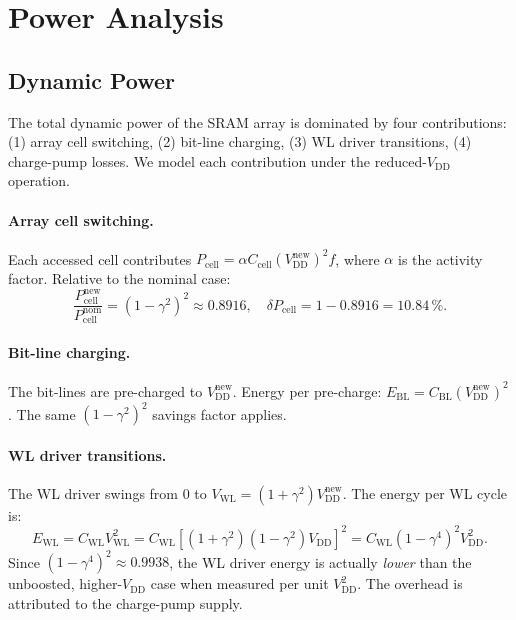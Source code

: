 \section{Power Analysis}
\label{sec:wlboost-power}

\subsection{Dynamic Power}

The total dynamic power of the SRAM array is dominated by four
contributions: (1) array cell switching, (2) bit-line charging, (3)
WL driver transitions, (4) charge-pump losses.  We model each
contribution under the reduced-$V_{\mathrm{DD}}$ operation.

\paragraph{Array cell switching.}
Each accessed cell contributes $P_{\mathrm{cell}} = \alpha C_{\mathrm{cell}}
(V_{\mathrm{DD}}^{\mathrm{new}})^{2} f$, where $\alpha$ is the
activity factor.  Relative to the nominal case:
\[
  \frac{P_{\mathrm{cell}}^{\mathrm{new}}}{P_{\mathrm{cell}}^{\mathrm{nom}}}
  = (1-\gamma^{2})^{2} \approx 0.8916, \quad
  \delta P_{\mathrm{cell}} = 1 - 0.8916 = 10.84\,\%.
\]

\paragraph{Bit-line charging.}
The bit-lines are pre-charged to $V_{\mathrm{DD}}^{\mathrm{new}}$.
Energy per pre-charge: $E_{\mathrm{BL}} = C_{\mathrm{BL}}
(V_{\mathrm{DD}}^{\mathrm{new}})^{2}$.  The same $(1-\gamma^{2})^{2}$
savings factor applies.

\paragraph{WL driver transitions.}
The WL driver swings from 0 to $V_{\mathrm{WL}} = (1+\gamma^{2})V_{\mathrm{DD}}^{\mathrm{new}}$.
The energy per WL cycle is:
\[
  E_{\mathrm{WL}} = C_{\mathrm{WL}} V_{\mathrm{WL}}^{2}
  = C_{\mathrm{WL}} [(1+\gamma^{2})(1-\gamma^{2})V_{\mathrm{DD}}]^{2}
  = C_{\mathrm{WL}} (1-\gamma^{4})^{2} V_{\mathrm{DD}}^{2}.
\]
Since $(1-\gamma^{4})^{2} \approx 0.9938$, the WL driver energy is
actually \emph{lower} than the unboosted, higher-$V_{\mathrm{DD}}$ case
when measured per unit $V_{\mathrm{DD}}^{2}$.  The overhead is
attributed to the charge-pump supply.

